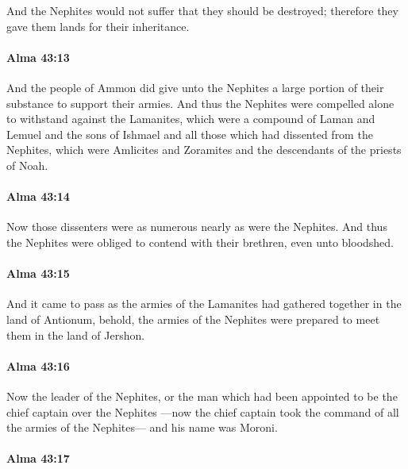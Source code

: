 			And the Nephites would not suffer that they should be destroyed;
			therefore they gave them lands for their inheritance.

		\paragraph{Alma 43:13} %
			\label{ALMA-43-13}

			And the people of Ammon did give unto the Nephites
			a large portion of their substance to support their armies.
			And thus the Nephites were compelled alone to withstand against the Lamanites,
			which were a compound of Laman and Lemuel and the sons of Ishmael
			and all those which had dissented from the Nephites,
			which were Amlicites and Zoramites and the descendants of the priests of Noah.

		\paragraph{Alma 43:14} %
			\label{ALMA-43-14}

			Now those dissenters were as numerous nearly as were the Nephites.
			And thus the Nephites were obliged to contend with their brethren,
			even unto bloodshed.

		\paragraph{Alma 43:15} %
			\label{ALMA-43-15}

			And it came to pass as the armies of the Lamanites
			had gathered together in the land of Antionum,
			behold, the armies of the Nephites were prepared
			to meet them in the land of Jershon.

		\paragraph{Alma 43:16} %
			\label{ALMA-43-16}

			Now the leader of the Nephites,
			or the man which had been appointed to be the chief captain over the Nephites
			---now the chief captain took the command of all the armies of the Nephites---
			and his name was Moroni.

		\paragraph{Alma 43:17} %
			\label{ALMA-43-17}

